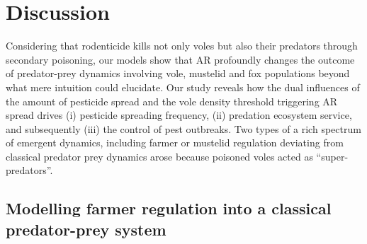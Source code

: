 \documentclass[11pt]{article}
\begin{document}
%
%


\section{Discussion} 

Considering that rodenticide kills not only voles but also their predators through secondary poisoning, our models show that AR profoundly changes the outcome of predator-prey dynamics involving vole, mustelid and fox populations beyond what mere intuition could elucidate. Our study reveals how the dual influences of the amount of pesticide spread and the vole density threshold triggering AR spread drives (i) pesticide spreading frequency, (ii) predation ecosystem service, and subsequently (iii) the control of pest outbreaks. Two types of a rich spectrum of emergent dynamics, including farmer or mustelid regulation deviating from classical predator prey dynamics arose because poisoned voles acted as “super-predators”. 

\subsection{Modelling farmer regulation into a classical predator-prey system}
 
\end{document}
